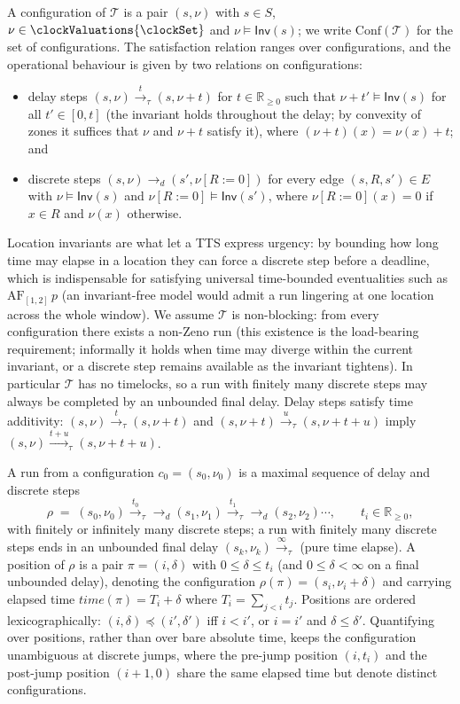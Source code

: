 A {configuration} of $\mathcal{T}$ is a pair $(s,\nu)$ with $s \in S$, $\nu \in \clockValuations{\clockSet}$ and $\nu\models\mathsf{Inv}(s)$; we write $\mathrm{Conf}(\mathcal{T})$ for the set of configurations. The satisfaction relation ranges over configurations, and the operational behaviour is given by two relations on configurations:
\begin{itemize}
  \item {delay} steps $(s,\nu) \xrightarrow{\;t\;}_{\tau} (s,\nu+t)$ for $t \in \mathbb{R}_{\ge 0}$ such that $\nu+t'\models\mathsf{Inv}(s)$ for all $t'\in[0,t]$ (the invariant holds throughout the delay; by convexity of zones it suffices that $\nu$ and $\nu+t$ satisfy it), where $(\nu+t)(x) = \nu(x)+t$; and
  \item {discrete} steps $(s,\nu) \rightarrow_d (s',\nu[R:=0])$ for every edge $(s,R,s') \in E$ with $\nu\models\mathsf{Inv}(s)$ and $\nu[R:=0]\models\mathsf{Inv}(s')$, where $\nu[R:=0](x) = 0$ if $x \in R$ and $\nu(x)$ otherwise.
\end{itemize}
Location invariants are what let a TTS express {urgency}: by bounding how long time may elapse in a location they can force a discrete step before a deadline, which is indispensable for satisfying universal time-bounded eventualities such as $\mathrm{AF}_{[1,2]}\,p$ (an invariant-free model would admit a run lingering at one location across the whole window). We assume $\mathcal{T}$ is {non-blocking}: from every configuration there {exists} a non-Zeno run (this existence is the load-bearing requirement; informally it holds when time may diverge within the current invariant, or a discrete step remains available as the invariant tightens). In particular $\mathcal{T}$ has no timelocks, so a run with finitely many discrete steps may always be completed by an unbounded final delay. Delay steps satisfy time additivity: $(s,\nu) \xrightarrow{t}_{\tau} (s,\nu+t)$ and $(s,\nu+t)\xrightarrow{u}_{\tau}(s,\nu+t+u)$ imply $(s,\nu)\xrightarrow{t+u}_{\tau}(s,\nu+t+u)$.

A {run} from a configuration $c_0=(s_0,\nu_0)$ is a maximal sequence of delay and discrete steps
\[
\rho \;=\; (s_0,\nu_0)\xrightarrow{t_0}_{\tau} \rightarrow_d (s_1,\nu_1)\xrightarrow{t_1}_{\tau} \rightarrow_d (s_2,\nu_2)\cdots,\qquad t_i \in \mathbb{R}_{\ge 0},
\]
with finitely or infinitely many discrete steps; a run with finitely many discrete steps ends in an unbounded final delay $(s_k,\nu_k)\xrightarrow{\infty}_{\tau}$ (pure time elapse). A {position} of $\rho$ is a pair $\pi=(i,\delta)$ with $0\le\delta\le t_i$ (and $0\le\delta<\infty$ on a final unbounded delay), denoting the configuration $\rho(\pi)=(s_i,\nu_i+\delta)$ and carrying {elapsed time} $\mathit{time}(\pi)=T_i+\delta$ where $T_i=\sum_{j<i} t_j$. Positions are ordered lexicographically: $(i,\delta)\preceq(i',\delta')$ iff $i<i'$, or $i=i'$ and $\delta\le\delta'$. Quantifying over positions, rather than over bare absolute time, keeps the configuration unambiguous at discrete jumps, where the pre-jump position $(i,t_i)$ and the post-jump position $(i{+}1,0)$ share the same elapsed time but denote distinct configurations.

